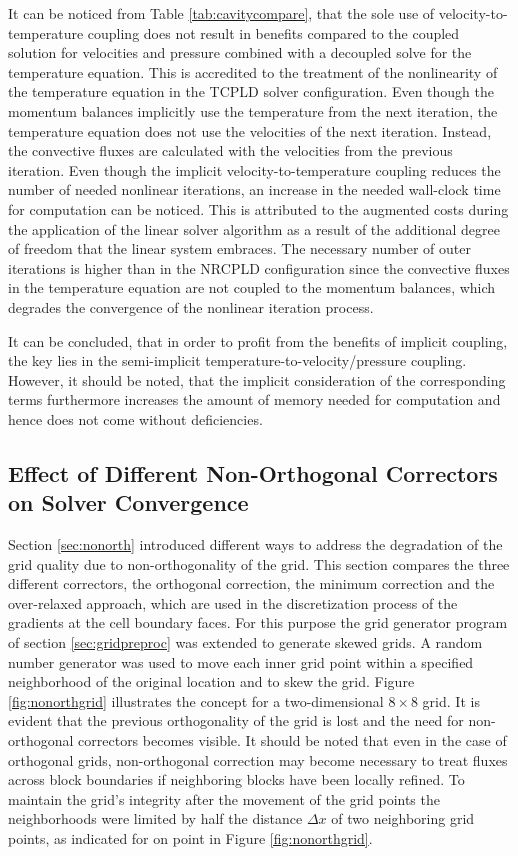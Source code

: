 It can be noticed from Table \ref{tab:cavitycompare}, that the sole use of velocity-to-temperature coupling does not result in benefits compared to the coupled solution for velocities and pressure combined with a decoupled solve for the temperature equation. This is accredited to the treatment of the nonlinearity of the temperature equation in the TCPLD solver configuration. Even though the momentum balances implicitly use the temperature from the next iteration, the temperature equation does not use the velocities of the next iteration. Instead, the convective fluxes are calculated with the velocities from the previous iteration. Even though the implicit velocity-to-temperature coupling reduces the number of needed nonlinear iterations, an increase in the needed wall-clock time for computation can be noticed. This is attributed to the augmented costs during the application of the linear solver algorithm as a result of the additional degree of freedom that the linear system embraces. The necessary number of outer iterations is higher than in the NRCPLD configuration since the convective fluxes in the temperature equation are not coupled to the momentum balances, which degrades the convergence of the nonlinear iteration process.

It can be concluded, that in order to profit from the benefits of implicit coupling, the key lies in the semi-implicit temperature-to-velocity/pressure coupling. However, it should be noted, that the implicit consideration of the corresponding terms furthermore increases the amount of memory needed for computation and hence does not come without deficiencies.

\subsection{Effect of Different Non-Orthogonal Correctors on Solver Convergence}
\label{sec:studynonorth}

Section \ref{sec:nonorth} introduced different ways to address the degradation of the grid quality due to non-orthogonality of the grid. This section compares the three different correctors, the orthogonal correction, the minimum correction and the over-relaxed approach, which are used in the discretization process of the gradients at the cell boundary faces. For this purpose the grid generator program of section \ref{sec:gridpreproc} was extended to generate skewed grids. A random number generator was used to move each inner grid point within a specified neighborhood of the original location and to skew the grid. Figure \ref{fig:nonorthgrid} illustrates the concept for a two-dimensional \(8 \times 8\) grid. It is evident that the previous orthogonality of the grid is lost and the need for non-orthogonal correctors becomes visible. It should be noted that even in the case of orthogonal grids, non-orthogonal correction may become necessary to treat fluxes across block boundaries if neighboring blocks have been locally refined. To maintain the grid's integrity after the movement of the grid points the neighborhoods were limited by half the distance \(\Delta x\) of two neighboring grid points, as indicated for on point in Figure \ref{fig:nonorthgrid}.

